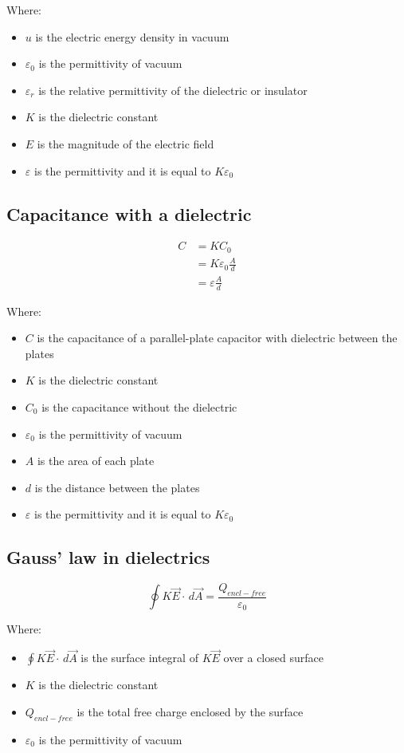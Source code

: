 \documentclass[11pt]{article}
\begin{document}
Where:
\begin{itemize}
\item \(u\) is the electric energy density in vacuum
\item \(\varepsilon_0\) is the permittivity of vacuum
\item \(\varepsilon_r\) is the relative permittivity of the dielectric or insulator
\item \(K\) is the dielectric constant
\item \(E\) is the magnitude of the electric field
\item \(\varepsilon\) is the permittivity and it is equal to \(K \varepsilon_0\)
\end{itemize}

\newpage
\subsection{Capacitance with a dielectric}
\label{sec:org4be1732}
\begin{align*}
C &= KC_0 \\
&= K \varepsilon_0 \frac{A}{d} \\
&= \varepsilon \frac{A}{d}
\end{align*}

Where:
\begin{itemize}
\item \(C\) is the capacitance of a parallel-plate capacitor with dielectric between the plates
\item \(K\) is the dielectric constant
\item \(C_0\) is the capacitance without the dielectric
\item \(\varepsilon_0\) is the permittivity of vacuum
\item \(A\) is the area of each plate
\item \(d\) is the distance between the plates
\item \(\varepsilon\) is the permittivity and it is equal to \(K \varepsilon_0\)
\end{itemize}
\subsection{Gauss' law in dielectrics}
\label{sec:orgaf4798e}
\[\oint K \vec{E} \cdot \, d \vec{A} = \frac{Q_{encl-free}}{\varepsilon_0}\]

Where:
\begin{itemize}
\item \(\oint K \vec{E} \cdot \, d \vec{A}\) is the surface integral of \(K \vec{E}\) over a closed surface
\item \(K\) is the dielectric constant
\item \(Q_{encl-free}\) is the total free charge enclosed by the surface
\item \(\varepsilon_0\) is the permittivity of vacuum
\end{itemize}
\end{document}
